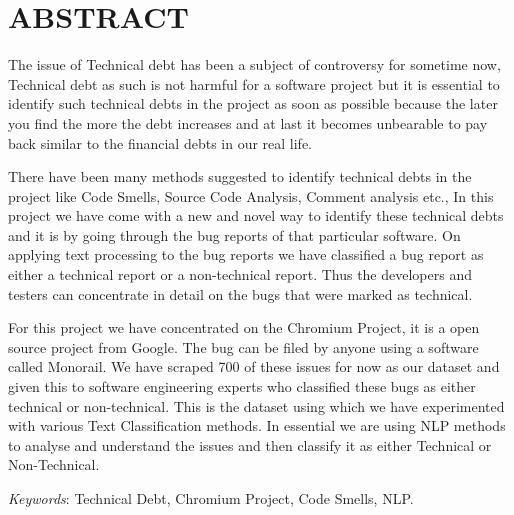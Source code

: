 \chapter*{\uppercase{ABSTRACT}}

The issue of Technical debt has been a subject of controversy for sometime now, Technical debt as such is not harmful for a software project but it is essential to identify such technical debts in the project as soon as possible because the later you find the more the debt increases and at last it becomes unbearable to pay back similar to the financial debts in our real life.
\par There have been many methods suggested to identify technical debts in the project like Code Smells, Source Code Analysis, Comment analysis etc., In this project we have come with a new and novel way to identify these technical debts and it is by going through the bug reports of that particular software. On applying text processing to the bug reports we have classified a bug report as either a technical report or a non-technical report. Thus the developers and testers can concentrate in detail on the bugs that were marked as technical.
\par For this project we have concentrated on the Chromium Project, it is a open source project from Google. The bug can be filed by anyone using a software called Monorail. We have scraped 700 of these issues for now as our dataset and given this to software engineering experts who classified these bugs as either technical or non-technical. This is the dataset using which we have experimented with various Text Classification methods. In essential we are using NLP methods to analyse and understand the issues and then classify it as either Technical or Non-Technical.
\par \emph{Keywords}: Technical Debt, Chromium Project, Code Smells, NLP.
